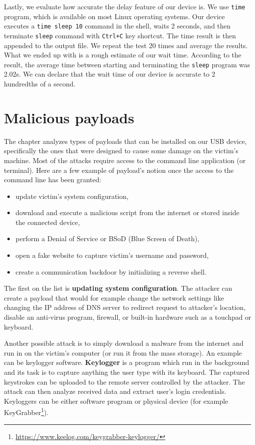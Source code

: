 Lastly, we evaluate how accurate the delay feature of our device is. We use \verb|time| program, which is available on most Linux operating systems. Our device executes a \verb|time sleep 10| command in the shell, waits 2 seconds, and then terminate \verb|sleep| command with \verb|Ctrl+C| key shortcut. The time result is then appended to the output file. We repeat the test 20 times and average the results. What we ended up with is a rough estimate of our wait time. According to the result, the average time between starting and terminating the \verb|sleep| program was 2.02s. We can declare that the wait time of our device is accurate to 2 hundredths of a second.

\chapter{Malicious payloads}
\label{maliciousPayloads}
The chapter analyzes types of payloads that can be installed on our USB device, specifically the ones that were designed to cause some damage on the victim's machine. Most of the attacks require access to the command line application (or terminal). Here are a few example of payload's notion once the access to the command line has been granted:

\begin{itemize}
    \item update victim's system configuration,
    \item download and execute a malicious script from the internet or stored inside the connected device,
    \item perform a Denial of Service or BSoD (Blue Screen of Death),
    \item open a fake website to capture victim's username and password,
    \item create a communication backdoor by initializing a reverse shell.
\end{itemize}

The first on the list is \textbf{updating system configuration}. The attacker can create a payload that would for example change the network settings like changing the IP address of DNS server to redirect request to attacker's location, disable an anti-virus program, firewall, or built-in hardware such as a touchpad or keyboard.

Another possible attack is to simply download a malware from the internet and run in on the victim's computer (or run it from the mass storage). An example can be keylogger software. \textbf{Keylogger} is a program which run in the background and its task is to capture anything the user type with its keyboard. The captured keystrokes can be uploaded to the remote server controlled by the attacker. The attack can then analyze received data and extract user's login credentials. Keyloggers can be either software program or physical device (for example KeyGrabber\footnote{\url{https://www.keelog.com/keygrabber-keylogger/}}).

